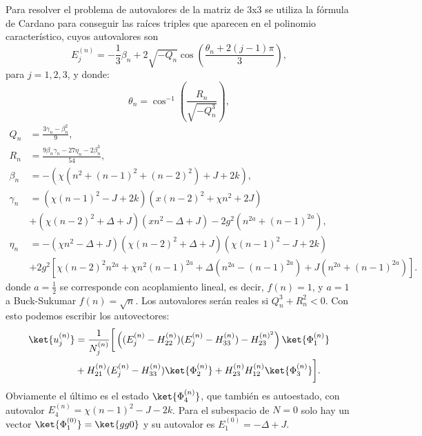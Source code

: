 Para resolver el problema de autovalores de la matriz de 3x3 se utiliza la fórmula de Cardano para conseguir las ra\'ices triples que aparecen en el polinomio caracter\'istico, cuyos autovalores son
\begin{equation}
    E_j^{(n)}=-\frac{1}{3}\beta_n+2\sqrt{-Q_n}\cos{\left(\frac{\theta_n+2(j-1)\pi}{3}\right)},
    \label{ec4:autoenergias}
\end{equation}
para $j=1,2,3$, y donde:
\begin{equation}
    \theta_n=\cos^{-1}\left(\frac{R_n}{\sqrt{-Q_n^3}}\right),
\end{equation}
\begin{equation}
    \begin{aligned}
        Q_n & = \frac{3\gamma_n-\beta_n^2}{9} ,\\
        R_n & = \frac{9\beta_n\gamma_n-27\eta_n-2\beta_n^3}{54} ,\\
        \beta_n & = - \left( \chi(n^2+(n-1)^2+(n-2)^2)+J+2k\right) ,\\
        \gamma_n & = (\chi(n-1)^2 - J + 2k)(x(n-2)^2+\chi n^2+2J) \\ 
        & +(\chi (n-2)^2+\Delta+J)(x n^2-\Delta+J)-2g^2(n^{2a}+(n-1)^{2a}) ,\\ 
        \eta_n &= -(\chi n^2-\Delta+J)(\chi(n-2)^2+\Delta+J)(\chi(n-1)^2-J+2k) \\
        &+2g^2 \left[  \chi(n-2)^2n^{2a}+\chi n^2(n-1)^{2a}+\Delta\left(n^{2a}-(n-1)^{2a}\right) +J(n^{2a}+(n-1)^{2a})\right].
    \end{aligned} 
    \label{ec4:parametros solucion}
\end{equation}
donde $a=\frac{1}{2}$ se corresponde con acoplamiento lineal, es decir, $f(n)=1$, y $a=1$ a Buck-Sukumar $f(n)=\sqrt{n}$. Los autovalores ser\'an reales si $Q_n^3+R_n^2<0$.
Con esto podemos escribir los autovectores:
\begin{equation}
    \begin{split}
        \ket{u_j^{(n)}} &= \frac{1}{N_j^{(n)}} \bigg[ \left((E_j^{(n)} - H_{22}^{(n)})(E_j^{(n)}-H_{33}^{(n)}) - H_{23}^{(n)^2} \right) \ket{\Phi_1^{(n)}} \\ &+ H_{21}^{(n)}(E_j^{(n)}-H_{33}^{(n)})\ket{\Phi_2^{(n)}} + H_{23}^{(n)}H_{12}^{(n)}\ket{\Phi_3^{(n)}}\bigg].
    \end{split}
\end{equation}
Obviamente el último es el estado $\ket{\Phi_4^{(n)}}$, que también es autoestado, con autovalor $E_4^{(n)}=\chi(n-1)^2-J-2k$.
Para el subespacio de $N=0$ solo hay un vector $\ket{\Phi_1^{(0)}}=\ket{gg0}$ y su autovalor es $E_1^{(0)}=-\Delta+J$.
